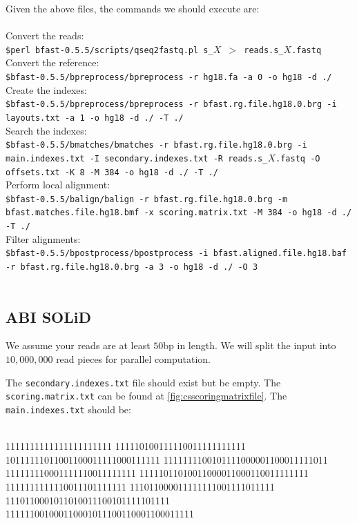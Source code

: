 \documentclass[a4paper,12pt]{book}
\newcommand{\Version}{0.5.5}
\begin{document}
Given the above files, the commands we should execute are:
\\\\
Convert the reads:\\
{\tt \scriptsize \$perl bfast-\Version{}/scripts/qseq2fastq.pl s\_$X$ $>$ reads.s\_$X$.fastq\\}
Convert the reference:\\
{\tt \scriptsize \$bfast-\Version{}/bpreprocess/bpreprocess -r hg18.fa -a 0 -o hg18 -d ./\\}
Create the indexes:\\
{\tt \scriptsize \$bfast-\Version{}/bpreprocess/bpreprocess -r bfast.rg.file.hg18.0.brg -i layouts.txt -a 1 -o hg18 -d ./ -T ./\\}
Search the indexes:\\
{\tt \scriptsize \$bfast-\Version{}/bmatches/bmatches -r bfast.rg.file.hg18.0.brg -i main.indexes.txt -I secondary.indexes.txt -R reads.s\_$X$.fastq -O offsets.txt -K 8 -M 384 -o hg18 -d ./ -T ./\\}
Perform local alignment:\\
{\tt \scriptsize \$bfast-\Version{}/balign/balign -r bfast.rg.file.hg18.0.brg -m bfast.matches.file.hg18.bmf -x scoring.matrix.txt -M 384 -o hg18 -d ./ -T ./\\}
Filter alignments:\\
{\tt \scriptsize \$bfast-\Version{}/bpostprocess/bpostprocess -i bfast.aligned.file.hg18.baf -r bfast.rg.file.hg18.0.brg -a 3 -o hg18 -d ./ -O 3\\}
\\

\subsection{ABI SOLiD}
\label{sec:hg-settings-abi}
We assume your reads are at least $50$bp in length.
We will split the input into $10,000,000$ read pieces for parallel computation.

The {\tt secondary.indexes.txt} file should exist but be empty.
The {\tt scoring.matrix.txt} can be found at \autoref{fig:csscoringmatrixfile}. 
The {\tt main.indexes.txt} should be:\\
\\
\begin{boxedverbatim}
1111111111111111111111
111110100111110011111111111
10111111011001100011111000111111
1111111100101111000001100011111011
111111110001111110011111111
11111011010011000011000110011111111
1111111111110011101111111
111011000011111111001111011111
1110110001011010011100101111101111
111111001000110001011100110001100011111
\end{boxedverbatim}
\\
\end{document}
